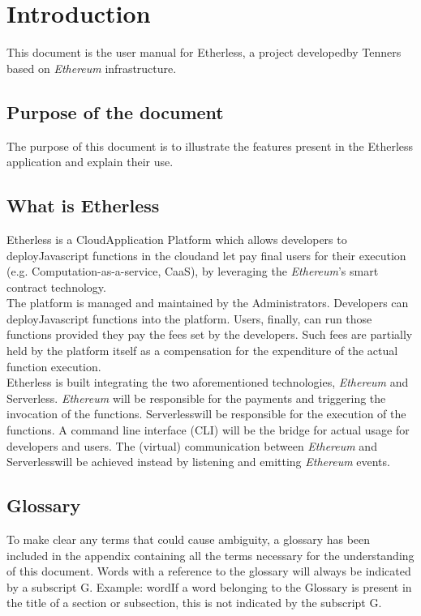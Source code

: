 \section{Introduction}
This document is the user manual for Etherless, a project developed\glo by Tenners based on \textit{Ethereum\glo} infrastructure.
\subsection{Purpose of the document}
The purpose of this document is to illustrate the features present in the Etherless application and explain their use.
\subsection{What is Etherless}
Etherless is a Cloud\glo Application Platform which allows developers to deploy\glo Javascript functions in the cloud\glo and let pay final users for their execution (e.g. Computation-as-a-service, CaaS), by leveraging the \textit{Ethereum\glos}'s smart contract technology.\\
The platform is managed and maintained by the Administrators. 
Developers can deploy\glo Javascript functions into the platform. Users, finally, can run those functions provided they pay the fees set by the developers. Such fees are partially held by the platform itself as a compensation for the expenditure of the actual function execution.\\
Etherless is built integrating the two aforementioned technologies, \textit{Ethereum\glo} and Serverless\glos. \textit{Ethereum\glo} will be responsible for the payments and triggering the invocation of the functions. Serverless\glo will be responsible for the execution of the functions. A command line interface (CLI\glo) will be the bridge for actual usage for developers and users. The (virtual) communication between \textit{Ethereum\glo} and Serverless\glo will be achieved instead by listening and emitting \textit{Ethereum\glo} events. 
\subsection{Glossary}
To make clear any terms that could cause ambiguity, a glossary has been included in the appendix containing all the terms necessary for the understanding of this document. Words with a reference to the glossary will always be indicated by a subscript G. Example: word\glo If a word belonging to the Glossary is present in the title of a section or subsection, this is not indicated by the subscript G.
